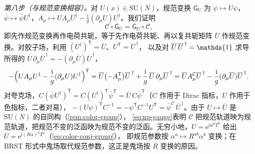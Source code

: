 \documentclass[UTF8,a4paper,11pt,fontset=fandol]{ctexart}
\makeatletter
\let\amsmathbb\mathbb
\renewcommand{\mathbb}[1]{\ifx1#1\mathds{1}\else\amsmathbb{#1}\fi}
\theoremstyle{cplain}
\theoremstyle{cdefinition}
\theoremstyle{cremark}
\renewcommand{\proofname}{证明}
\renewenvironment{proof}[1][\proofname]{\par\pushQED{\qed}\normalfont\topsep6\p@\@plus6\p@\relax
  \trivlist\item[\hskip\labelsep\itshape #1\hspace{0.5em}]\ignorespaces}{\popQED\endtrivlist\@endpefalse}
\numberwithin{equation}{section}
\newcommand{\tp}{\mathsf{T}}                         %
\newcommand{\Cop}{\mathcal{C}}                       %
\newcommand{\ii}{\mathrm{i}}                        %
\newcommand{\ee}{\mathrm{e}}                        %
\makeatother
\begin{document}
\begin{proof}
\emph{第八步（与规范变换相容）。}对 $U(x)\in\mathrm{SU}(N)$，规范变换 $\mathsf G_U$ 为 $\psi\mapsto U\psi$，$\bar\psi\mapsto\bar\psi U^\dagger$，$A_\mu\mapsto UA_\mu U^\dagger-\frac{\ii}{g}(\partial_\mu U)U^\dagger$。我们证明
\begin{equation}\label{eq:np-gauge}
\Cop\circ\mathsf G_U=\mathsf G_{\overline U}\circ\Cop ,
\end{equation}
即先作规范变换再作电荷共轭，等于先作电荷共轭、再以复共轭矩阵 $\overline U$ 作规范变换。对胶子场，利用 $(U^\dagger)^{\tp}=\overline U$、$U^{\tp}=\overline U^{\,\dagger}$，
以及对 $\overline U\,\overline U^{\,\dagger}=\mathbb 1$ 求导所得的 $\overline U\,\partial_\mu\overline U^{\,\dagger}=-(\partial_\mu\overline U)\overline U^{\,\dagger}$，
\begin{equation*}
-\Bigl(UA_\mu U^\dagger-\frac{\ii}{g}(\partial_\mu U)U^\dagger\Bigr)^{\tp}
=\overline U\bigl(-A^{\tp}_\mu\bigr)\overline U^{\,\dagger}+\frac{\ii}{g}\,\overline U\,\partial_\mu\overline U^{\,\dagger}
=\overline U A^{\Cop}_\mu\overline U^{\,\dagger}-\frac{\ii}{g}(\partial_\mu\overline U)\overline U^{\,\dagger}.
\end{equation*}
对夸克场，$C(\bar\psi U^\dagger)^{\tp}=C(U^\dagger)^{\tp}\bar\psi^{\tp}=\overline U\,C\bar\psi^{\tp}$（$C$ 作用于 Dirac 指标，$U$ 作用于色指标，二者对易），
$-(U\psi)^{\tp}C^{-1}=-\psi^{\tp}C^{-1}U^{\tp}=\bar\psi^{\Cop}\,\overline U^{\,\dagger}$。由于 $U\mapsto\overline U$ 是 $\mathrm{SU}(N)$ 的自同构（\cref{rem:color-group}），
\cref{eq:np-gauge}表明 $\Cop$ 把规范轨道映为规范轨道，把规范不变的泛函映为规范不变的泛函。无穷小地，$U=\ee^{\ii\alpha^aT^a}$ 给出 $\overline U=\ee^{\ii(R\alpha)^aT^a}$（\cref{eq:color-conj-group}），
即规范参数按 $\alpha^a\mapsto R^{ab}\alpha^b$ 变换；在 BRST 形式中鬼场取代规范参数，这正是鬼场按 $R$ 变换的原因。


\end{proof}
\end{document}
